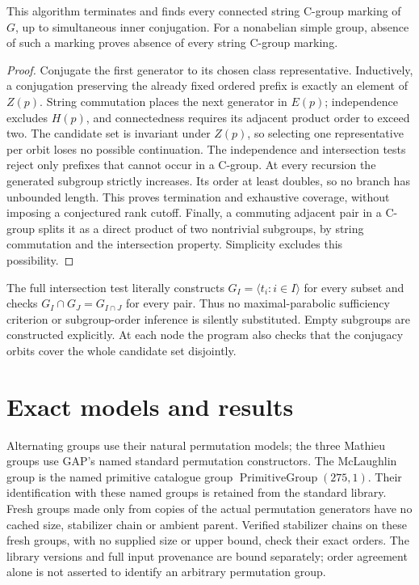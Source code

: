 \documentclass[11pt,a4paper]{article}
\newcommand{\gen}[1]{\langle #1\rangle}
\begin{document}
\begin{proposition}\label{complete}
This algorithm terminates and finds every connected string C-group marking
of $G$, up to simultaneous inner conjugation. For a nonabelian simple group,
absence of such a marking proves absence of every string C-group marking.
\end{proposition}
\begin{proof}
Conjugate the first generator to its chosen class representative. Inductively,
a conjugation preserving the already fixed ordered prefix is exactly an
element of $Z(p)$. String commutation places the next generator in $E(p)$;
independence excludes $H(p)$, and connectedness requires its adjacent product
order to exceed two. The candidate set is invariant under $Z(p)$, so selecting
one representative per orbit loses no possible continuation. The independence
and intersection tests reject only prefixes that cannot occur in a C-group.
At every recursion the generated subgroup strictly increases. Its order at
least doubles, so no branch has unbounded length. This proves termination
and exhaustive coverage, without imposing a conjectured rank cutoff.
Finally, a commuting adjacent pair in a C-group splits it as a direct product
of two nontrivial subgroups, by string commutation and the intersection
property. Simplicity excludes this possibility.
\end{proof}

The full intersection test literally constructs $G_I=\gen{t_i:i\in I}$
for every subset and checks $G_I\cap G_J=G_{I\cap J}$ for every pair.
Thus no maximal-parabolic sufficiency criterion or subgroup-order inference
is silently substituted. Empty subgroups are constructed explicitly.
At each node the program also checks that the conjugacy orbits cover the
whole candidate set disjointly.

\section{Exact models and results}
Alternating groups use their natural permutation models; the three Mathieu
groups use GAP's named standard permutation constructors. The McLaughlin
group is the named primitive catalogue group $\operatorname{PrimitiveGroup}(275,1)$.
Their identification with these named groups is retained from the standard
library. Fresh groups made only from copies of the actual permutation generators have
no cached size, stabilizer chain or ambient parent. Verified stabilizer chains
on these fresh groups, with no supplied size or upper bound, check their exact orders.
The library versions and full input provenance are bound separately; order
agreement alone is not asserted to identify an arbitrary permutation group.
\end{document}
